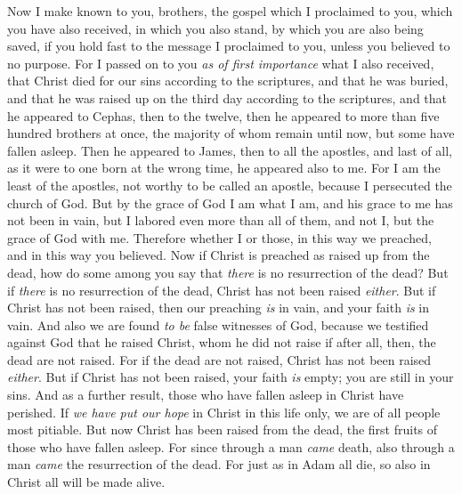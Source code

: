 \begin{biblechapter} %
 Now I make known to you, brothers, the gospel which I proclaimed to you, which you have also received, in which you also stand,
\verse by which you are also being saved, if you hold fast to the message I proclaimed to you, unless you believed to no purpose.
\verse For I passed on to you \textit{as of first importance} what I also received, that Christ died for our sins according to the scriptures,
\verse and that he was buried, and that he was raised up on the third day according to the scriptures,
\verse and that he appeared to Cephas, then to the twelve,
\verse then he appeared to more than five hundred brothers at once, the majority of whom remain until now, but some have fallen asleep.
\verse Then he appeared to James, then to all the apostles,
\verse and last of all, as it were to one born at the wrong time, he appeared also to me.
\verse For I am the least of the apostles, not worthy to be called an apostle, because I persecuted the church of God.
\verse But by the grace of God I am what I am, and his grace to me has not been in vain, but I labored even more than all of them, and not I, but the grace of God with me.
\verse Therefore whether I or those, in this way we preached, and in this way you believed.
 Now if Christ is preached as raised up from the dead, how do some among you say that \textit{there} is no resurrection of the dead?
\verse But if \textit{there} is no resurrection of the dead, Christ has not been raised \textit{either}.
\verse But if Christ has not been raised, then our preaching \textit{is} in vain, and your faith \textit{is} in vain.
\verse And also we are found \textit{to be} false witnesses of God, because we testified against God that he raised Christ, whom he did not raise if after all, then, the dead are not raised.
\verse For if the dead are not raised, Christ has not been raised \textit{either}.
\verse But if Christ has not been raised, your faith \textit{is} empty; you are still in your sins.
\verse And as a further result, those who have fallen asleep in Christ have perished.
\verse If \textit{we have put our hope} in Christ in this life only, we are of all people most pitiable.
\verse But now Christ has been raised from the dead, the first fruits of those who have fallen asleep.
\verse For since through a man \textit{came} death, also through a man \textit{came} the resurrection of the dead.
\verse For just as in Adam all die, so also in Christ all will be made alive.

\end{biblechapter}
